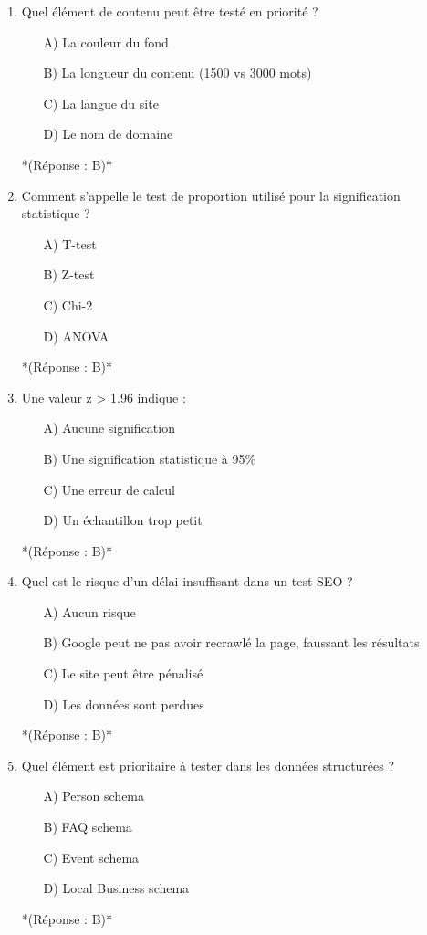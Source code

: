 \documentclass[12pt,a4paper,twoside]{report}
\begin{document}
\begin{enumerate}
    \item Quel élément de contenu peut être testé en priorité ?
    \begin{itemize}
        \item[A)] La couleur du fond
        \item[B)] La longueur du contenu (1500 vs 3000 mots)
        \item[C)] La langue du site
        \item[D)] Le nom de domaine
    \end{itemize}
    *(Réponse : B)*

    \item Comment s'appelle le test de proportion utilisé pour la signification statistique ?
    \begin{itemize}
        \item[A)] T-test
        \item[B)] Z-test
        \item[C)] Chi-2
        \item[D)] ANOVA
    \end{itemize}
    *(Réponse : B)*

    \item Une valeur z > 1.96 indique :
    \begin{itemize}
        \item[A)] Aucune signification
        \item[B)] Une signification statistique à 95\%
        \item[C)] Une erreur de calcul
        \item[D)] Un échantillon trop petit
    \end{itemize}
    *(Réponse : B)*

    \item Quel est le risque d'un délai insuffisant dans un test SEO ?
    \begin{itemize}
        \item[A)] Aucun risque
        \item[B)] Google peut ne pas avoir recrawlé la page, faussant les résultats
        \item[C)] Le site peut être pénalisé
        \item[D)] Les données sont perdues
    \end{itemize}
    *(Réponse : B)*

    \item Quel élément est prioritaire à tester dans les données structurées ?
    \begin{itemize}
        \item[A)] Person schema
        \item[B)] FAQ schema
        \item[C)] Event schema
        \item[D)] Local Business schema
    \end{itemize}
    *(Réponse : B)*


\end{enumerate}
\end{document}
